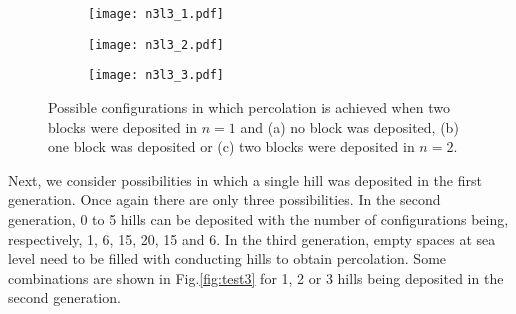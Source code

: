 \documentclass[amsmath,amssymb,amsfonts,aps,pre,preprint,superscriptaddress,bibnotes,showpacs,showkeys,longbibliography,nofootinbib]{revtex4-1}
\begin{document}
\begin{figure}[ht]
    \centering
    \begin{subfigure}{.32\textwidth}
      \centering
      \texttt{[image: n3l3\_1.pdf]}
      \caption{}
      \label{fig:sub4}
    \end{subfigure}%
    \begin{subfigure}{.32\textwidth}
      \centering
      \texttt{[image: n3l3\_2.pdf]}
      \caption{}
      \label{fig:sub5}
    \end{subfigure}
    \begin{subfigure}{.32\textwidth}
      \centering
      \texttt{[image: n3l3\_3.pdf]}
      \caption{}
      \label{fig:sub6}
    \end{subfigure}
    \caption{Possible configurations in which percolation is achieved when two blocks were deposited in $n=1$ and (a) no block was deposited, (b) one block was deposited or (c) two blocks were deposited in $n=2$.}
    \label{fig:test2}
\end{figure}

Next, we consider possibilities in which a single hill was deposited in the first generation. Once again there are only three possibilities. In the second generation, 0 to 5 hills can be deposited with the number of configurations being, respectively, 1, 6, 15, 20, 15 and 6. In the third generation, empty spaces at sea level need to be filled with conducting hills to obtain percolation. Some combinations are shown in Fig.\ref{fig:test3} for 1, 2 or 3 hills being deposited in the second generation.
\end{document}
